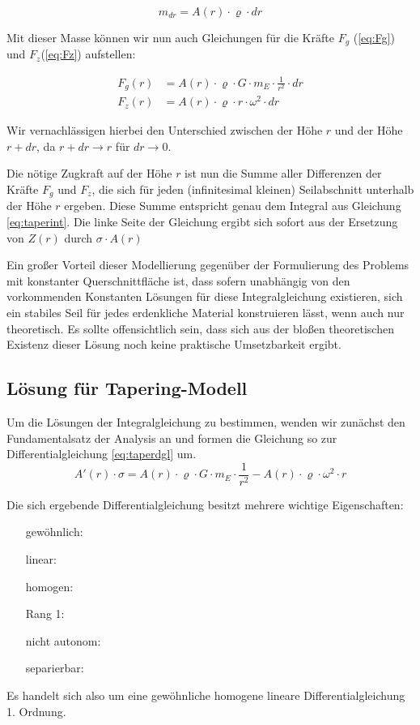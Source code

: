 \documentclass[a4paper, 10pt]{report}
\begin{document}
\begin{equation}
m_{dr} = A(r) \cdot \varrho \cdot dr
\label{eq:samass}
\end{equation}

Mit dieser Masse können wir nun auch Gleichungen für die Kräfte $F_g$ (\ref{eq:Fg}) und $F_z$(\ref{eq:Fz}) aufstellen:

\begin{align}
F_g(r) &= A(r) \cdot \varrho \cdot G \cdot m_E \cdot \frac{1}{r^2} \cdot dr\label{eq:Fg}\\
F_z(r) &= A(r) \cdot \varrho \cdot r \cdot \omega^2 \cdot dr\label{eq:Fz}
\end{align}

Wir vernachlässigen hierbei den Unterschied zwischen der Höhe $r$ und der Höhe $r+dr$, da $r+dr\rightarrow r$ für $dr \rightarrow 0$.

Die nötige Zugkraft auf der Höhe $r$ ist nun die Summe aller Differenzen der Kräfte $F_g$ und $F_z$, die sich für jeden (infinitesimal kleinen) Seilabschnitt unterhalb der Höhe $r$ ergeben. Diese Summe entspricht genau dem Integral aus Gleichung \ref{eq:taperint}. Die linke Seite der Gleichung ergibt sich sofort aus der Ersetzung von $Z(r)$ durch $\sigma \cdot A(r)$

Ein großer Vorteil dieser Modellierung gegenüber der Formulierung des Problems mit konstanter Querschnittfläche ist, dass sofern unabhängig von den vorkommenden Konstanten Lösungen für diese Integralgleichung existieren, sich ein stabiles Seil für jedes erdenkliche Material konstruieren lässt, wenn auch nur theoretisch. Es sollte offensichtlich sein, dass sich aus der bloßen theoretischen Existenz dieser Lösung noch keine praktische Umsetzbarkeit ergibt.

\subsection{Lösung für Tapering-Modell}

Um die Lösungen der Integralgleichung zu bestimmen, wenden wir zunächst den Fundamentalsatz der Analysis an und formen die Gleichung so zur Differentialgleichung \ref{eq:taperdgl} um.
\begin{equation}
A'(r) \cdot \sigma = A(r) \cdot \varrho \cdot G \cdot m_E \cdot \frac{1}{r^2} - A(r) \cdot \varrho \cdot \omega^2 \cdot r
\label{eq:taperdgl}
\end{equation}

Die sich ergebende Differentialgleichung besitzt mehrere wichtige Eigenschaften:
\begin{itemize}
\item[gewöhnlich:] %
\item[linear:] %
\item[homogen:] %
\item[Rang 1:] %
\item[nicht autonom:] %
\item[separierbar:] %
\end{itemize}
Es handelt sich also um eine gewöhnliche homogene lineare Differentialgleichung 1. Ordnung.
\end{document}
